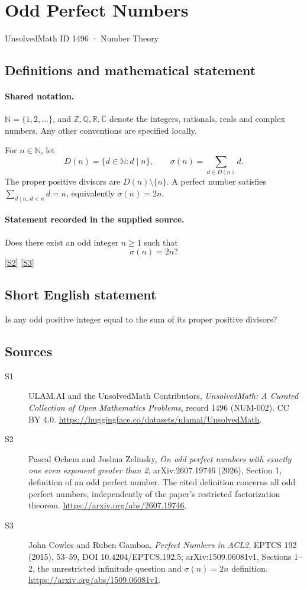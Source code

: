 \documentclass[11pt]{article}
\newcommand{\sref}[2]{\hyperlink{source:#1:#2}{[S#2]}}
\begin{document}
\setcounter{section}{1495}
\section{Odd Perfect Numbers}\label{1496}
{\small\sffamily UnsolvedMath ID 1496 · Number Theory}
\subsection{Definitions and mathematical statement}

\paragraph{Shared notation.}$\mathbb N=\{1,2,\ldots\}$, and $\mathbb Z,\mathbb Q,\mathbb R,\mathbb C$ denote the integers, rationals, reals and complex numbers. Any other conventions are specified locally.


For \(n\in\mathbb N\), let
\[
 D(n)=\{d\in\mathbb N:d\mid n\},\qquad
 \sigma(n)=\sum_{d\in D(n)}d.
\]
The proper positive divisors are \(D(n)\setminus\{n\}\).
A perfect number satisfies \(\sum_{d\mid n,\,d<n}d=n\), equivalently
\(\sigma(n)=2n\).
\paragraph{Statement recorded in the supplied source.}
Does there exist an odd integer \(n\ge1\) such that
\[
                            \sigma(n)=2n?
\] \sref{1496}{2} \sref{1496}{3}
\subsection{Short English statement}
Is any odd positive integer equal to the sum of its proper positive divisors?
\subsection{Sources}
\begin{description}
\item[\hypertarget{source:1496:1}{S1}] ULAM.AI and the UnsolvedMath Contributors, \emph{UnsolvedMath: A Curated Collection of Open Mathematics Problems}, record 1496 (NUM-002). CC BY 4.0. \url{https://huggingface.co/datasets/ulamai/UnsolvedMath}.
\item[\hypertarget{source:1496:2}{S2}] Pascal Ochem and Joshua Zelinsky, \emph{On odd perfect numbers with exactly one even exponent greater than 2}, arXiv:2607.19746 (2026), Section 1, definition of an odd perfect number. The cited definition concerns all odd perfect numbers, independently of the paper's restricted factorization theorem. \url{https://arxiv.org/abs/2607.19746}.
\item[\hypertarget{source:1496:3}{S3}] John Cowles and Ruben Gamboa, \emph{Perfect Numbers in ACL2}, EPTCS 192 (2015), 53--59, DOI 10.4204/EPTCS.192.5; arXiv:1509.06081v1, Sections 1--2, the unrestricted infinitude question and $\sigma(n)=2n$ definition. \url{https://arxiv.org/abs/1509.06081v1}.
\end{description}
\label{end:1496}
\end{document}
